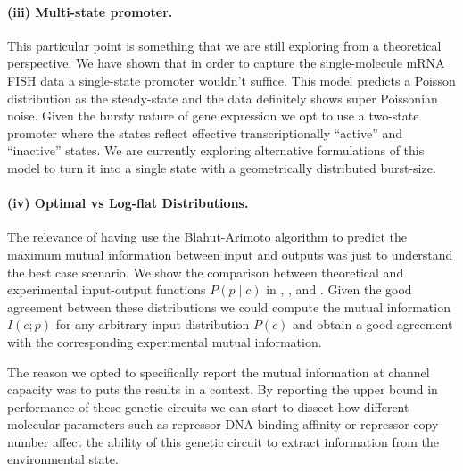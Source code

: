 \paragraph{(iii) Multi-state promoter.}
This particular point is something that we are still exploring from a
theoretical perspective. We have shown that in order to capture the
single-molecule mRNA FISH data a single-state promoter wouldn't suffice. This
model predicts a Poisson distribution as the steady-state and the data
definitely shows super Poissonian noise. Given the bursty nature of gene
expression we opt to use a two-state promoter where the states reflect effective
transcriptionally ``active'' and ``inactive'' states. We are currently exploring
alternative formulations of this model to turn it into a single state with a
geometrically distributed burst-size.

\paragraph{(iv) Optimal vs Log-flat Distributions.}
The relevance of having use the Blahut-Arimoto algorithm to predict the maximum
mutual information between input and outputs was just to understand the best
case scenario. We show the comparison between theoretical and experimental
input-output functions $P(p \mid c)$ in , ,
and . Given the good agreement between these distributions we
could compute the mutual information $I(c; p)$ for any arbitrary input
distribution $P(c)$ and obtain a good agreement with the corresponding
experimental mutual information.

The reason we opted to specifically report the mutual information at channel
capacity was to puts the results in a context. By reporting the upper bound in
performance of these genetic circuits we can start to dissect how different
molecular parameters such as repressor-DNA binding affinity or repressor copy
number affect the ability of this genetic circuit to extract information from
the environmental state.
